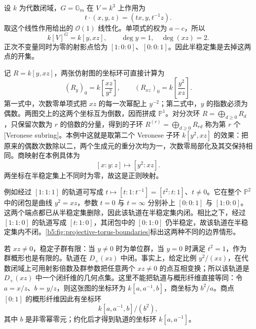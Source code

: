 \begin{example}\label{b5:exm:projective-torus-quotient}
	设 \(k\) 为代数闭域，\(G=\mathbb G_m\) 在 \(V=k^3\) 上作用为
	\[
		t\cdot(x,y,z)=(tx,y,t^{-1}z).
	\]
	取这个线性作用给出的 \(\mathcal O(1)\) 线性化。单项式的权为 \(a-c\)，所以
	\[
		k[V]^G=k[y,xz],\qquad \deg y=1,\quad\deg(xz)=2.
	\]
	正次不变量同时为零的射影点恰为 \([1:0:0]\)、\([0:0:1]\)。因此半稳定集是去掉这两点的开集。

	记 \(R=k[y,xz]\)，两张仿射图的坐标环可直接计算为
	\[
		(R_y)_0=k\left[\frac{xz}{y^2}\right],\qquad (R_{xz})_0=k\left[\frac{y^2}{xz}\right].
	\]
	第一式中，次数零单项式把 \(xz\) 的每一次幂配上 \(y^{-2}\)；第二式中，\(y\) 的指数必须为偶数。两图交上的这两个坐标互为倒数，因而拼成 \(\mathbb P^1\)。对分次环 \(R=\bigoplus_{d\ge0}R_d\)，只保留次数为 \(r\) 的倍数的分量，得到的子环 \(R^{(r)}=\bigoplus_{d\ge0}R_{rd}\) 称为第 \(r\) 个[Veronese subring]。本例中这就是取第二个 Veronese 子环 \(k[y^2,xz]\) 的效果：把原来的偶数次数除以二，两个生成元的重分次均为一，次数零局部化及其交保持相同。商映射在本例具体为
	\[
		[x:y:z]\longmapsto[y^2:xz].
	\]
	两坐标在半稳定集上不同时为零，故这是正则映射。

	\ProseParagraphBreak
	例如经过 \([1:1:1]\) 的轨道可写成 \(t\mapsto[t:1:t^{-1}]=[t^2:t:1]\)、\(t\ne0\)。它在整个 \(\mathbb P^2\) 中的闭包是曲线 \(y^2=xz\)，参数 \(t=0\) 与 \(t=\infty\) 分别补上 \([0:0:1]\) 与 \([1:0:0]\)。这两个端点都已从半稳定集删除，因此该轨道在半稳定集内闭。相比之下，经过 \([1:1:0]\) 的轨道写成 \([t:1:0]\)，其闭包中的 \([0:1:0]\) 仍半稳定，故该轨道在半稳定集内不闭。\cref{b5:fig:projective-torus-boundaries}标出这两种不同的边界情形。
	

	若 \(xz\ne0\)，稳定子群有限：当 \(y\ne0\) 时为单位群，当 \(y=0\) 时满足 \(t^2=1\)，作为群概形也是有限的。轨道在 \(D_+(xz)\) 中闭。事实上，给定比例 \(y^2/(xz)\)，在代数闭域上可用射影倍数及群参数把任意两个 \(xz\ne0\) 的点互相变换；所以该轨道是 \(D_+(xz)\) 中一个闭纤维的几何点集。这里不能把轨道与概形纤维直接等同：令 \(a=x/z\)、\(b=y/z\)，则这张图的坐标环为 \(k[a,a^{-1},b]\)，商坐标为 \(b^2/a\)。商点 \([0:1]\) 的概形纤维因此有坐标环
	\[
		k[a,a^{-1},b]/(b^2),
	\]
	其中 \(b\) 是非零幂零元；约化后才得到轨道的坐标环 \(k[a,a^{-1}]\)。


\end{example}
